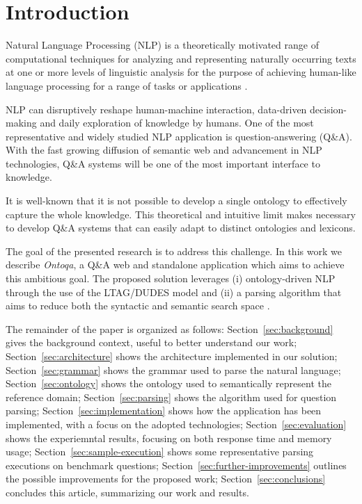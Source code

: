 \section{Introduction}
\label{sec:introduction}

Natural Language Processing (NLP) is a theoretically motivated range of
computational techniques for analyzing and representing naturally occurring texts
at one or more levels of linguistic analysis for the purpose of achieving human-like
language processing for a range of tasks or applications \cite{liddy2001natural}.

NLP can disruptively reshape human-machine interaction, data-driven decision-making and daily exploration of knowledge by humans.
%
One of the most representative and widely studied NLP application is question-answering (Q\&A).
%
With the fast growing diffusion of semantic web and advancement in NLP technologies, Q\&A systems will be one of the most important interface to knowledge.

It is well-known that it is not possible to develop a single ontology to effectively capture the whole knowledge.
%
This theoretical and intuitive limit makes necessary to develop Q\&A systems that can easily adapt to distinct ontologies and lexicons.

The goal of the presented research is to address this  challenge.
%
In this work we describe \textit{Ontoqa}, a Q\&A web and standalone application which aims to achieve this ambitious goal.
%
The proposed solution leverages (i) ontology-driven NLP through the use of the LTAG/DUDES model and (ii) a parsing algorithm that aims to reduce both the syntactic and  semantic search space \cite{cimiano2014ontology}.


The remainder of the paper is organized as follows:
Section~\ref{sec:background} gives the background context, useful to better understand our work;
Section~\ref{sec:architecture} shows the architecture implemented in our solution;
Section~\ref{sec:grammar} shows the grammar used to parse the natural language;
Section~\ref{sec:ontology} shows the ontology used to semantically represent the reference domain;
Section~\ref{sec:parsing} shows the algorithm used for question parsing;
Section~\ref{sec:implementation} shows how the application has been implemented, with a focus on the adopted technologies;
Section~\ref{sec:evaluation} shows the experiemntal results, focusing on both response time and memory usage;
Section~\ref{sec:sample-execution} shows some representative parsing executions on benchmark questions;
Section~\ref{sec:further-improvements} outlines the possible improvements for the proposed work;
Section~\ref{sec:conclusions} concludes this article, summarizing our work and results.